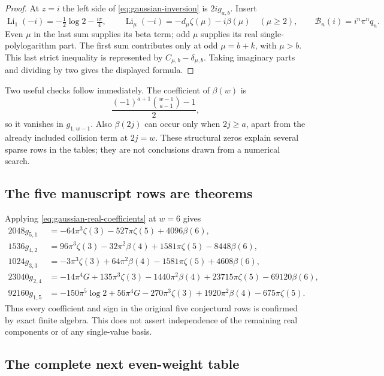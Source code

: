 \begin{proof}
At $z=i$ the left side of \eqref{eq:gaussian-inversion} is $2ig_{a,b}$.
Insert
\[
 \operatorname{Li}_1(-i)=-\tfrac12\log2-\tfrac{i\pi}{4},\qquad
 \operatorname{Li}_\mu(-i)=-d_\mu\zeta(\mu)-i\beta(\mu)\quad(\mu\ge2),
 \qquad\mathcal B_n(i)=i^n\pi^nq_n.
\]
Even $\mu$ in the last sum supplies its beta term; odd $\mu$ supplies
its real single-polylogarithm part. The first sum contributes only at odd
$\mu=b+k$, with $\mu>b$. This last strict inequality is represented by
$C_{\mu,b}-\delta_{\mu,b}$. Taking imaginary parts and dividing by two
gives the displayed formula.
\end{proof}

Two useful checks follow immediately. The coefficient of $\beta(w)$ is
\[
 \frac{(-1)^{a+1}\binom{w-1}{a-1}-1}{2},
\]
so it vanishes in $g_{1,w-1}$. Also $\beta(2j)$ can occur only when
$2j\ge a$, apart from the already included collision term at $2j=w$.
These structural zeros explain several sparse rows in the tables; they
are not conclusions drawn from a numerical search.

\subsection{The five manuscript rows are theorems}

Applying \eqref{eq:gaussian-real-coefficients} at $w=6$ gives
\begin{align}
 2048g_{5,1}&=-64\pi^3\zeta(3)-527\pi\zeta(5)+4096\beta(6),\\
 1536g_{4,2}&=96\pi^3\zeta(3)-32\pi^2\beta(4)
              +1581\pi\zeta(5)-8448\beta(6),\\
 1024g_{3,3}&=-3\pi^3\zeta(3)+64\pi^2\beta(4)
              -1581\pi\zeta(5)+4608\beta(6),\\
 23040g_{2,4}&=-14\pi^4G+135\pi^3\zeta(3)-1440\pi^2\beta(4)
               +23715\pi\zeta(5)-69120\beta(6),\\
 92160g_{1,5}&=-150\pi^5\log2+56\pi^4G-270\pi^3\zeta(3)
               +1920\pi^2\beta(4)-675\pi\zeta(5).
\end{align}
Thus every coefficient and sign in the original five conjectural rows is
confirmed by exact finite algebra. This does not assert independence of
the remaining real components or of any single-value basis.

\subsection{The complete next even-weight table}

